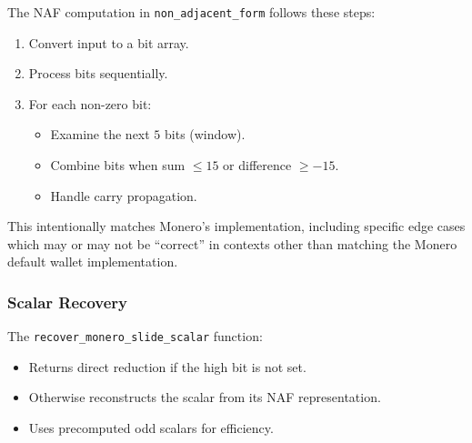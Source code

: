 \documentclass[12pt,a4paper]{article}
\begin{document}
The NAF computation in \texttt{non\_adjacent\_form} follows these steps:
\begin{enumerate}
  \item Convert input to a bit array.  %
  \item Process bits sequentially.  %
  \item For each non-zero bit: %
    \begin{itemize}
      \item Examine the next $5$ bits (window).  %
      \item Combine bits when sum $\leq 15$ or difference $\geq -15$.  %
      \item Handle carry propagation.  %
    \end{itemize}
\end{enumerate}

This intentionally matches Monero's implementation, including specific edge cases which may or may not be ``correct'' in contexts other than matching the Monero default wallet implementation.

\subsubsection{Scalar Recovery}
The \texttt{recover\_monero\_slide\_scalar} function:
\begin{itemize}
  \item Returns direct reduction if the high bit is not set.  %
  \item Otherwise reconstructs the scalar from its NAF representation.  %
  \item Uses precomputed odd scalars for efficiency.  %
\end{itemize}
\end{document}
